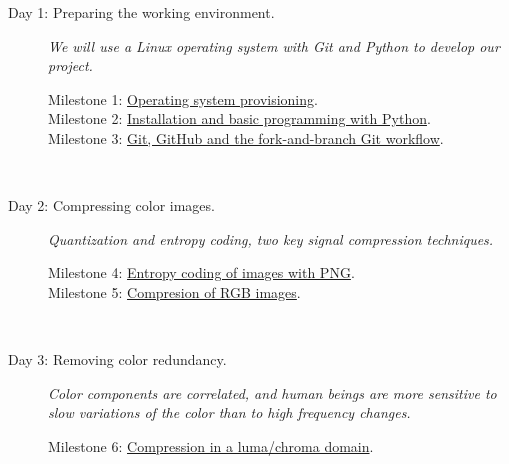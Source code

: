 \begin{description}
\item [Day 1: {\normalfont Preparing the working
    environment.}] \emph{We will use a Linux operating system with
  Git and Python to develop our project.}
  \begin{description}
  \item [Milestone 1: {\normalfont \href{https://sistemas-multimedia.github.io/milestones/01-provisioning/}{Operating system provisioning}.}]
  \item [Milestone 2: {\normalfont \href{https://sistemas-multimedia.github.io/milestones/02-python/}{Installation and basic programming with Python}.}]
  \item [Milestone 3: {\normalfont \href{https://sistemas-multimedia.github.io/milestones/03-git/}{Git, GitHub and the fork-and-branch Git workflow}.}]
  \end{description}
  ~\newline

\item [Day 2: {\normalfont Compressing color images.}] \emph{Quantization and entropy coding, two key signal compression techniques.}
  \begin{description}
  \item [Milestone 4: {\normalfont \href{https://sistemas-multimedia.github.io/milestones/04-Motion_PNG/}{Entropy coding of images with PNG}.}]
  \item [Milestone 5: {\normalfont \href{https://sistemas-multimedia.github.io/milestones/05-RGB_compression/}{Compresion of RGB images}.}]
  \end{description}
  ~\newline

\item [Day 3: {\normalfont Removing color redundancy.}] \emph{Color
    components are correlated, and human beings are more sensitive to
    slow variations of the color than to high frequency changes.}
  \begin{description}
   \item [Milestone 6: {\normalfont \href{https://sistemas-multimedia.github.io/milestones/06-YUV_compression/}{Compression in a luma/chroma domain}.}]
  \end{description}
  ~\newline


\end{description}
